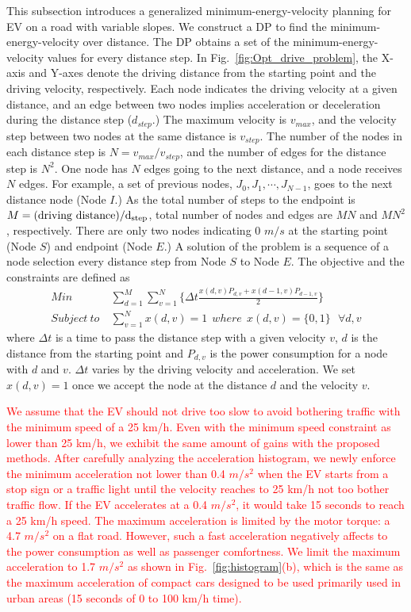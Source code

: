 \documentclass{IEEEtran}
\begin{document}
This subsection introduces a generalized minimum-energy-velocity planning for EV  on a road with variable slopes. We construct a DP to find the minimum-energy-velocity over distance. The DP obtains a set of the minimum-energy-velocity values for every distance step. In Fig.~\ref{fig:Opt_drive_problem}, the X-axis and Y-axes denote the driving distance from the starting point and the driving velocity, respectively. Each node indicates the driving velocity at a given distance, and an edge between two nodes implies acceleration or deceleration during the distance step ($d_{step}$.) The maximum velocity is $v_{max}$, and the velocity step between two nodes at the same distance is $v_{step}$. The number of the nodes in each distance step is $N = v_{max} / v_{step}$, and the number of edges for the distance step is $N^2$. One node has $N$ edges going to the next distance, and a node receives $N$ edges. For example, a set of previous nodes, $J_0, J_1, \cdots, J_{N-1}$, goes to the next distance node (Node $I$.) As the total number of steps to the endpoint is $M = (\rm driving~distance) / d_{step}$, total number of nodes and edges are $MN$ and $MN^2$, respectively. There are only two nodes indicating 0 $m/s$ at the starting point (Node $S$) and endpoint (Node $E$.) A solution of the problem is a sequence of a node selection every distance step from Node $S$ to Node $E$. The objective and the constraints are defined as
%
\begin{align} %
Min ~& \sum_{d=1}^{M}\sum_{v=1}^{N}\{\Delta t \frac{x(d,v)P_{d,v} + x(d-1,v)P_{d-1,v}}{2}\} \label{eq:objective}\\
Subject~to ~& \sum_{v=1}^{N}x(d,v) = 1~~where~~x(d,v) = \{0, 1\} ~~~\forall d, v \nonumber
\end{align}
%
where $\Delta t$ is a time to pass the distance step with a given velocity $v$, $d$ is the distance from the starting point and $P_{d,v}$ is the power consumption for a node with $d$ and $v$. $\Delta t$ varies by the driving velocity and acceleration. We set $x(d,v)=1$ once we accept the node at the distance $d$ and the velocity $v$.
 
\textcolor{red}{We assume that the EV should not drive too slow to avoid bothering traffic with the minimum speed of a 25 km/h. Even with the minimum speed constraint as lower than 25 km/h, we exhibit the same amount of gains with the proposed methods.
%
After carefully analyzing the acceleration histogram, we newly enforce the minimum acceleration not lower than 0.4 $m/s^2$ when the EV starts from a stop sign or a traffic light until the velocity reaches to 25 km/h not too bother traffic flow. If the EV accelerates at a 0.4 $m/s^2$, it would take 15 seconds to reach a 25 km/h speed. 
%
The maximum acceleration is limited by the motor torque: a 4.7 $m/s^2$ on a flat road.  However, such a fast acceleration negatively affects to the  power consumption as well as passenger comfortness. We limit the maximum acceleration to 1.7 $m/s^2$ as shown in Fig.~\ref{fig:histogram}(b), which is the same as the maximum acceleration of compact cars designed to be used primarily used in urban areas (15 seconds of 0 to 100 km/h time).}
\end{document}
